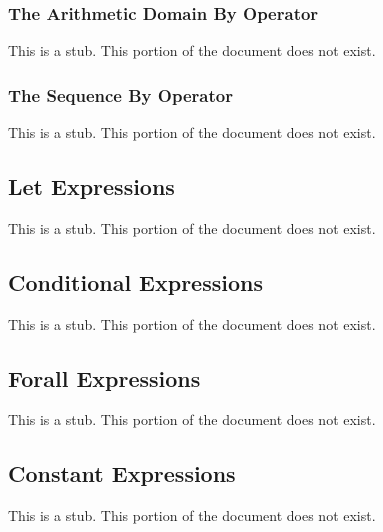 \subsubsection{The Arithmetic Domain By Operator}
\label{The_Arithmetic_Domain_By_Operator}

This is a stub.  This portion of the document does not exist.

\subsubsection{The Sequence By Operator}
\label{The_Sequence_By_Operator}

This is a stub.  This portion of the document does not exist.

\subsection{Let Expressions}
\label{Let_Expressions}

This is a stub.  This portion of the document does not exist.

\subsection{Conditional Expressions}
\label{Conditional_Expressions}

This is a stub.  This portion of the document does not exist.

\subsection{Forall Expressions}
\label{Forall_Expressions}

This is a stub.  This portion of the document does not exist.

\subsection{Constant Expressions}
\label{Constant_Expressions}

This is a stub.  This portion of the document does not exist.
